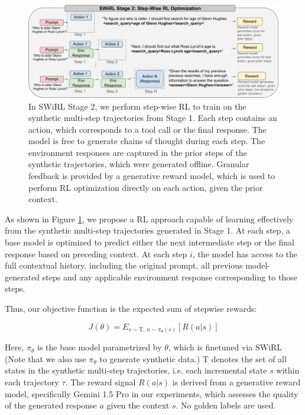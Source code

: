 \documentclass{article} %
\newcommand{\Tau}{\mathrm{T}}
\begin{document}
\begin{figure}[htbp!]
    \centering
    \includegraphics[width=1.0\textwidth]{stepwise-rl.pdf}
    \caption{In SWiRL Stage 2, we perform step-wise RL to train on the synthetic multi-step trajectories from Stage 1. Each step contains an action, which corresponds to a tool call or the final response. The model is free to generate chains of thought during each step. The environment responses are captured in the prior steps of the synthetic trajectories, which were generated offline. Granular feedback is provided by a generative reward model, which is used to perform RL optimization directly on each action, given the prior context.}
    \label{fig:process-rl}
\end{figure}

As shown in Figure \ref{fig:process-rl}, we propose a RL approach capable of learning effectively from the synthetic multi-step trajectories generated in Stage 1. At each step, a base model is optimized to predict either the next intermediate step or the final response based on preceding context. At each step $i$, the model has access to the full contextual history, including the original prompt, all previous model-generated steps and any applicable environment response corresponding to those steps.

Thus, our objective function is the expected sum of stepwise rewards:

$$J(\theta) = E_{s\sim\Tau,~a\sim \pi_\theta(s)} \left[R(a|s) \right]$$


Here, $\pi_\theta$ is the base model parametrized by $\theta$, which is finetuned via SWiRL (Note that we also use $\pi_\theta$ to generate synthetic data.) $\Tau$ denotes the set of all states in the synthetic multi-step trajectories, i.e. each incremental state $s$ within each trajectory $\tau$. The reward signal $R(a|s)$ is derived from a generative reward model, specifically Gemini 1.5 Pro in our experiments, which assesses the quality of the generated response $a$ given the context $s$. No golden labels are used.
\end{document}
